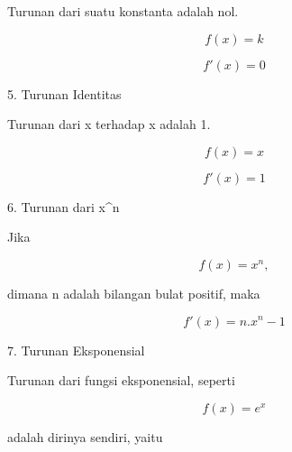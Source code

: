 \documentclass[a4paper,10pt]{article}
\begin{document}
\begin{eulernotebook}
\begin{eulercomment}
\begin{eulercomment}
\begin{eulercomment}
\begin{eulercomment}
\begin{eulercomment}
\begin{eulercomment}
\begin{eulercomment}
\begin{eulercomment}
\begin{eulercomment}
\begin{eulercomment}
\begin{eulercomment}
\begin{eulercomment}
\begin{eulercomment}
\begin{eulercomment}
\begin{eulercomment}
Turunan dari suatu konstanta adalah nol.

\end{eulercomment}
\begin{eulerformula}
\[
f(x) = k
\]
\end{eulerformula}
\begin{eulerformula}
\[
f'(x) = 0
\]
\end{eulerformula}
\begin{eulercomment}
5. Turunan Identitas

Turunan dari x terhadap x adalah 1.

\end{eulercomment}
\begin{eulerformula}
\[
f(x) = x
\]
\end{eulerformula}
\begin{eulerformula}
\[
f'(x) = 1
\]
\end{eulerformula}
\begin{eulercomment}
6. Turunan dari x\textasciicircum{}n

Jika\\
\end{eulercomment}
\begin{eulerformula}
\[
f(x)=x^n,
\]
\end{eulerformula}
\begin{eulercomment}
dimana n adalah bilangan bulat positif, maka

\end{eulercomment}
\begin{eulerformula}
\[
f'(x)=n.x^n-1
\]
\end{eulerformula}
\begin{eulercomment}
7. Turunan Eksponensial

Turunan dari fungsi eksponensial, seperti

\end{eulercomment}
\begin{eulerformula}
\[
f(x)=e^x
\]
\end{eulerformula}
\begin{eulercomment}
adalah dirinya sendiri, yaitu


\end{eulercomment}
\end{eulercomment}
\end{eulercomment}
\end{eulercomment}
\end{eulercomment}
\end{eulercomment}
\end{eulercomment}
\end{eulercomment}
\end{eulercomment}
\end{eulercomment}
\end{eulercomment}
\end{eulercomment}
\end{eulercomment}
\end{eulercomment}
\end{eulercomment}
\end{eulernotebook}
\end{document}

